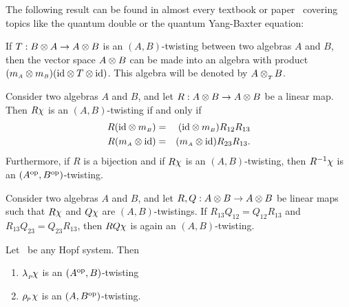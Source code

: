 The following result can be found in almost every textbook or paper \cite{Schmudgen,FonsSabine}\
covering topics like the quantum double or the quantum Yang-Baxter equation:

\begin{prop_sec} \label{prop:twisted_tensorproduct}
If\/ $T : B \otimes A \rightarrow  A \otimes B$ is an\/ $(A,B)$-twisting between two
algebras\/ $A$ and\/ $B$, then the vector space\/ $A\otimes B$ can be made into an
algebra with product\/ $(m_{\scriptscriptstyle A} \otimes m_{\scriptscriptstyle B})(\mbox{\rm id} \otimes T \otimes \mbox{\rm id})$.
\rm This algebra will be denoted by $A\otimes_{_T\!} B$.
\end{prop_sec}


\begin{lemma_sec}   \label{lem:twisting}
Consider two algebras $A$ and\/ $B$, and let\/ $R: A \otimes B \rightarrow A \otimes B$
be a linear map. Then\/ $R\chi$ is an $(A,B)$-twisting if and only if
\begin{eqnarray}
   R(\mbox{\rm id} \otimes m_{\scriptscriptstyle B}) &=& (\mbox{\rm id} \otimes m_{\scriptscriptstyle B}) R_{12} R_{13}  \label{eq:lemmma:twisting1}  \\
   R(m_{\scriptscriptstyle A} \otimes \mbox{\rm id}) &=& (m_{\scriptscriptstyle A} \otimes \mbox{\rm id}) R_{23} R_{13}. \label{eq:lemmma:twisting2}
\end{eqnarray}
Furthermore, if\/ $R$ is a bijection and if\/ $R\chi$ is an $(A,B)$-twisting,
then\/ $R^{-1}\chi$ is an $(A^{\rm op},B^{\rm op})$-twisting.
\end{lemma_sec}


\begin{lemma_sec}   \label{lem:compose_twistings}
Consider two algebras $A$ and\/ $B$, and let\/ $R, Q: A \otimes B \rightarrow A \otimes B$
be linear maps such that\/ $R\chi$ and\/ $Q\chi$ are  $(A,B)$-twistings.
If\/ $R_{13}Q_{12} = Q_{12}R_{13}$ and\/ $R_{13}Q_{23} = Q_{23}R_{13}$,
then\/ $RQ\chi$ is again an $(A,B)$-twisting.
\end{lemma_sec}


\begin{prop_sec} \label{prop:twistings:lprp}
Let\/ \pairAB\ be any Hopf system. Then\/
\begin{enumerate}
  \item $\lambda_{_P\!}\chi$ is an\/ $(A^{\rm op},B)$-twisting
  \item $\rho_{_{\!P}}\chi$ is an\/ $(A,B^{\rm op})$-twisting.
\end{enumerate}
\end{prop_sec}

